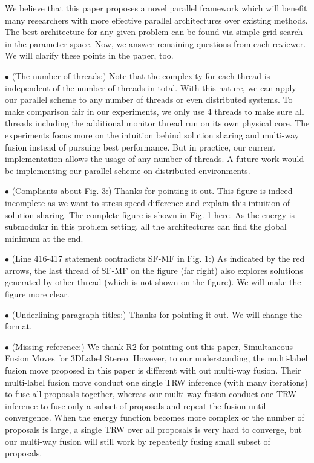 \documentclass[runningheads]{llncs}
\begin{document}
\vspace{0.15cm} We believe that this paper proposes a novel
parallel framework which will benefit many researchers with
more effective parallel architectures over existing
methods. The best architecture for any given problem can be
found via simple grid search in the parameter space. Now, we
answer remaining questions from each reviewer. We will
clarify these points in the paper, too.

\vspace{0.15cm}

\vspace{0.15cm}
\noindent $\bullet$ (The number of threads:) Note that the
complexity for each thread is independent of the number of
threads in total. With this nature, we can apply our
parallel scheme to any number of threads or even distributed
systems. To make comparison fair in our experiments, we only
use 4 threads to make sure all threads including the
additional monitor thread run on its own physical core. The
experiments focus more on the intuition behind solution
sharing and multi-way fusion instead of pursuing best performance. But in
practice, our current implementation allows the usage of any
number of threads. A future work would be implementing our
parallel scheme on distributed environments.

\noindent $\bullet$ (Compliants about Fig. 3:) Thanks for
pointing it out. This figure is indeed incomplete as we want
to stress speed difference and explain this intuition of
solution sharing. The complete figure is shown in Fig. 1
here. As the energy is submodular in this problem setting,
all the architectures can find the global minimum at the
end.

\noindent $\bullet$ (Line 416-417 statement contradicts SF-MF in Fig. 1:) As indicated by the red arrows, the last thread of SF-MF on the figure (far right) also explores solutions generated by other thread (which is not shown on the figure). We will make the figure more clear.

\noindent $\bullet$ (Underlining paragraph titles:) Thanks for pointing it out. We will change the format.

\vspace{0.15cm}
\noindent $\bullet$ (Missing reference:) We thank R2 for
pointing out this paper, Simultaneous Fusion Moves for
3D­Label Stereo. However, to our understanding, the
multi-label fusion move proposed in this paper is different
with out multi-way fusion. Their multi-label fusion move
conduct one single TRW inference (with many iterations) to
fuse all proposals together, whereas our multi-way fusion
conduct one TRW inference to fuse only a subset of proposals
and repeat the fusion until convergence. When the energy
function becomes more complex or the number of proposals is
large, a single TRW over all proposals is very hard to
converge, but our multi-way fusion will still work by
repeatedly fusing small subset of proposals.
\end{document}
